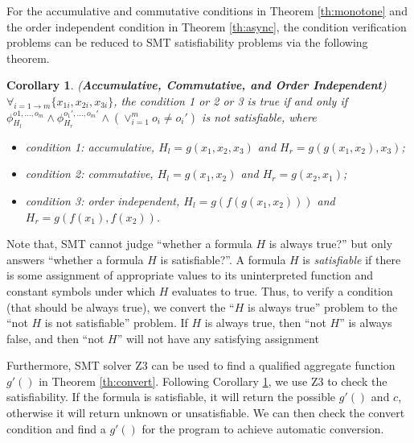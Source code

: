 For the accumulative and commutative conditions in Theorem \ref{th:monotone} and the order independent condition in Theorem \ref{th:async}, the condition verification problems can be reduced to SMT satisfiability problems via the following theorem.

\newtheorem{corollary}{Corollary}
\begin{corollary}
	\label{coro:auto:1}
	(\textbf{Accumulative, Commutative, and Order Independent}) $\forall_{i=1\to m} \{x_{1i},x_{2i},x_{3i}\}$, the condition 1 or 2 or 3 is true if and only if $\phi_{H_l}^{o1,\ldots,o_m}\wedge \phi_{H_r}^{o_1',\ldots,o_m'}\wedge (\vee_{i=1}^m{o_i\neq o_i'})$ is not satisfiable, where
	\begin{itemize}
		\item condition 1: accumulative, $H_l=g(x_1,x_2,x_3)$ and $H_r=g(g(x_1,x_2),x_3)$;
		\item condition 2: commutative, $H_l=g(x_1,x_2)$ and $H_r=g(x_2,x_1)$;
		\item condition 3: order independent, $H_l=g(f(g(x_1,x_2)))$ and $H_r=g(f(x_1),f(x_2))$.
	\end{itemize}
\end{corollary}

Note that, SMT cannot judge ``whether a formula $H$ is always true?'' but only answers ``whether a formula $H$ is satisfiable?''. A formula $H$ is \emph{satisfiable} if there is some assignment of appropriate values to its uninterpreted function and constant symbols under which $H$ evaluates to true. Thus, to verify a condition (that should be always true), we convert the ``$H$ is always true'' problem to the ``not $H$ is not satisfiable'' problem. If $H$ is always true, then ``not $H$'' is always false, and then ``not $H$'' will not have any satisfying assignment


Furthermore, SMT solver Z3 can be used to find a qualified aggregate function $g'()$ in Theorem \ref{th:convert}.
Following Corollary \ref{coro:auto:1}, we use Z3 to check the satisfiability. If the formula is satisfiable, it will return the possible $g'()$ and $c$, otherwise it will return unknown or unsatisfiable. We can then check the convert condition and find a $g'()$ for the program to achieve automatic conversion.
